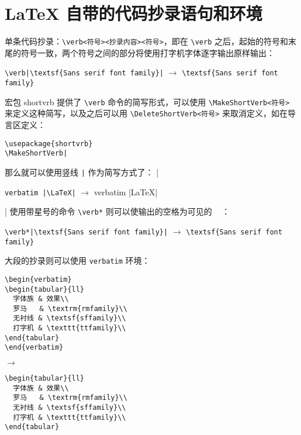 \documentclass[UTF8,hyperref]{ctexart}
\begin{document}
\section{LaTeX 自带的代码抄录语句和环境}
单条代码抄录：\verb|\verb<符号><抄录内容><符号>|，即在 \verb|\verb| 之后，起始的符号和末尾的符号一致，两个符号之间的部分将使用打字机字体逐字输出原样输出：
\begin{flushleft}
  \verb"\verb|\textsf{Sans serif font family}|"
  $\rightarrow$
  \verb|\textsf{Sans serif font family}|
\end{flushleft}
宏包 shortvrb 提供了 \verb|\verb| 命令的简写形式，可以使用 \verb|\MakeShortVerb<符号>| 来定义这种简写，以及之后可以用 \verb|\DeleteShortVerb<符号>| 来取消定义，如在导言区定义：
\begin{verbatim}
\usepackage{shortvrb}
\MakeShortVerb|
\end{verbatim}
那么就可以使用竖线 \verb!|! 作为简写方式了：
\MakeShortVerb|
\begin{flushleft}
\verb!verbatim |\LaTeX|!
$\rightarrow$
verbatim |\LaTeX|
\end{flushleft}
\DeleteShortVerb|
使用带星号的命令 \verb|\verb*| 则可以使输出的空格为可见的 \verb*| | ：
\begin{flushleft}
  \verb"\verb*|\textsf{Sans serif font family}|"
  $\rightarrow$
  \verb*|\textsf{Sans serif font family}|
\end{flushleft}
大段的抄录则可以使用 \verb|verbatim| 环境：
\begin{flushleft}
\begin{minipage}{0.38\linewidth}
\verb|\begin{verbatim}|\\
\verb|\begin{tabular}{ll}|\\
\verb|  字体族 & 效果\\|\\
\verb|  罗马   & \textrm{rmfamily}\\|\\
\verb|  无衬线 & \textsf{sffamily}\\|\\
\verb|  打字机 & \texttt{ttfamily}\\|\\
\verb|\end{tabular}|\\
\verb|\end{verbatim}|
\end{minipage}
$\rightarrow$
\begin{minipage}{0.45\linewidth}
\begin{verbatim}
\begin{tabular}{ll}
  字体族 & 效果\\
  罗马   & \textrm{rmfamily}\\
  无衬线 & \textsf{sffamily}\\
  打字机 & \texttt{ttfamily}\\
\end{tabular}
\end{verbatim}
\end{minipage}
\end{flushleft}
\end{document}
